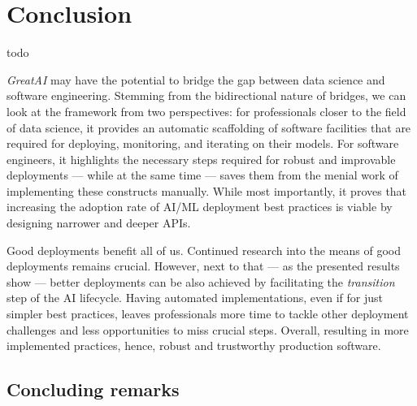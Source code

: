 \chapter{Conclusion}  \label{chapter:conclusion}

todo

\textit{GreatAI} may have the potential to bridge the gap between data science and software engineering. Stemming from the bidirectional nature of bridges, we can look at the framework from two perspectives: for professionals closer to the field of data science, it provides an automatic scaffolding of software facilities that are required for deploying, monitoring, and iterating on their models. For software engineers, it highlights the necessary steps required for robust and improvable deployments --- while at the same time --- saves them from the menial work of implementing these constructs manually. While most importantly, it proves that increasing the adoption rate of AI/ML deployment best practices is viable by designing narrower and deeper APIs.

Good deployments benefit all of us. Continued research into the means of good deployments remains crucial. However, next to that --- as the presented results show --- better deployments can be also achieved by facilitating the \textit{transition} step of the AI lifecycle. Having automated implementations, even if for just simpler best practices, leaves professionals more time to tackle other deployment challenges and less opportunities to miss crucial steps. Overall, resulting in more implemented practices, hence, robust and trustworthy production software.

\section{Concluding remarks}
